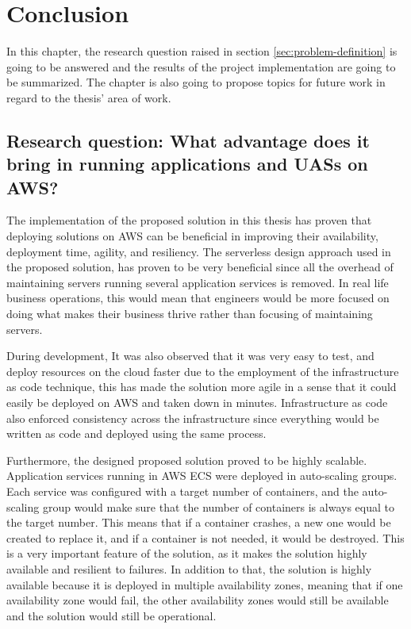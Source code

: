 
\chapter{Conclusion}
\label{chap:conclusion}

In this chapter, the research question raised in section \ref{sec:problem-definition} is going to be answered and the results of the project implementation are going to be summarized. The chapter is also going to propose topics for future work in regard to the thesis' area of work.

\section{Research question: What advantage does it bring in running applications and UASs on AWS?}

The implementation of the proposed solution in this thesis has proven that deploying solutions on AWS can be beneficial in improving their availability, deployment time, agility, and resiliency. The serverless design approach used in the proposed solution, has proven to be very beneficial since all the overhead of maintaining servers running several application services is removed. In real life business operations, this would mean that engineers would be more focused on doing what makes their business thrive rather than focusing of maintaining servers.

During development, It was also observed that it was very easy to test, and deploy resources on the cloud faster due to the employment of the infrastructure as code technique, this has made the solution more agile in a sense that it could easily be deployed on AWS and taken down in minutes. Infrastructure as code also enforced consistency across the infrastructure since everything would be written as code and deployed using the same process.

Furthermore, the designed proposed solution proved to be highly scalable. Application services running in AWS ECS were deployed in auto-scaling groups. Each service was configured with a target number of containers, and the auto-scaling group would make sure that the number of containers is always equal to the target number. This means that if a container crashes, a new one would be created to replace it, and if a container is not needed, it would be destroyed. This is a very important feature of the solution, as it makes the solution highly available and resilient to failures. In addition to that, the solution is highly available because it is deployed in multiple availability zones, meaning that if one availability zone would fail, the other availability zones would still be available and the solution would still be operational.

